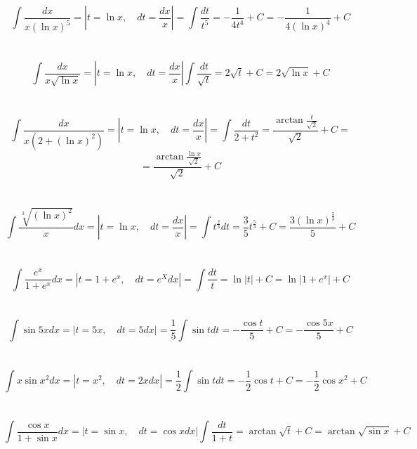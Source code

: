 \section{}
    \[\int \frac{dx}{x (\ln{x})^5} = \left|t = \ln{x}, \quad dt =
    \frac{dx}{x} \right| = \int \frac{dt}{t^5} = - \frac{1}{4 t^4} + C =
    - \frac{1}{4 (\ln{x})^4} + C\]
    
\section{}
    \[\int \frac{dx}{x \sqrt{\ln{x}}} = \left|t = \ln{x}, \quad
    dt = \frac{dx}{x} \right| \int \frac{dt}{\sqrt{t}} = 2 \sqrt{t} + C =
    2 \sqrt{\ln{x}} + C\]    

\section{}
    \[\int \frac{dx}{x(2 + (\ln{x})^2)} = \left|t = \ln{x}, \quad
    dt = \frac{dx}{x} \right| = \int \frac{dt}{2 + t^2} =
    \frac{\arctan{\frac{t}{\sqrt{2}}}}{\sqrt{2}} + C =\]    
    \[= \frac{\arctan{\frac{\ln{x}}{\sqrt{2}}}}{\sqrt{2}} + C\]

\section{}
    \[\int \frac{\sqrt[3]{(\ln{x})^2}}{x}dx = \left|t = \ln{x}, \quad
    dt = \frac{dx}{x} \right| = \int t^{\frac{2}{3}}dt =
    \frac{3}{5} t^{\frac{5}{3}} + C = \frac{3 (\ln{x})^{\frac{5}{3}}}{5} + C\]
    
\section{}
    \[\int \frac{e^x}{1 + e^x}dx = \left|t = 1 + e^x, \quad
    dt = e^Xdx \right| = \int \frac{dt}{t} = \ln{|t|} + C =
    \ln{|1 + e^x|} + C\]  
    
\section{}
    \[\int \sin{5x}dx = \left|t = 5x, \quad dt = 5dx \right| =
    \frac{1}{5} \int \sin{t}dt = - \frac{\cos{t}}{5} + C =
    - \frac{\cos{5x}}{5} + C\]    

\section{}
    \[\int x \sin{x^2}dx = \left|t = x^2, \quad dt = 2xdx \right| =
    \frac{1}{2} \int \sin{t}dt = - \frac{1}{2} \cos{t} + C =
    - \frac{1}{2} \cos{x^2} + C\]    

\section{}
    \[\int \frac{\cos{x}}{1 + \sin{x}}dx = \left|t = \sin{x}, \quad
    dt = \cos{x}dx \right| \int \frac{dt}{1 + t} = \arctan{\sqrt{t}}
    + C = \arctan{\sqrt{\sin{x}}} + C\]    